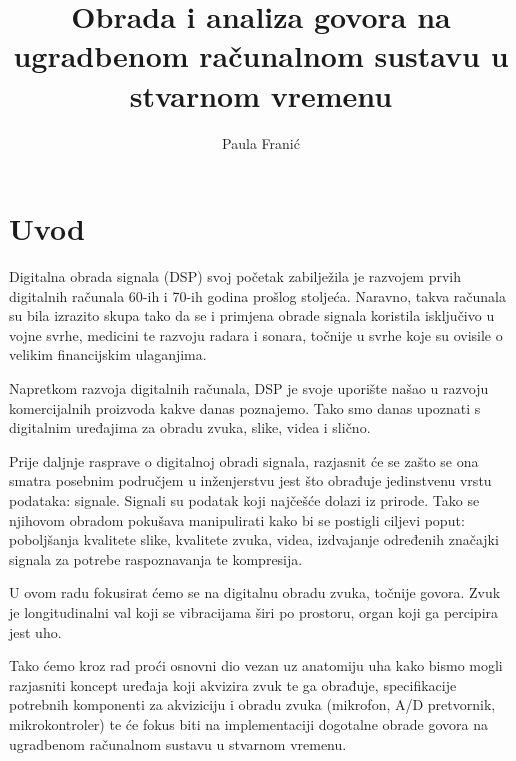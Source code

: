 \documentclass[times, utf8, diplomski]{fer}
\begin{document}

\title{Obrada i analiza govora na ugradbenom računalnom sustavu u stvarnom vremenu}

\author{Paula Franić}

\maketitle

\izvornik

\zahvala{}

\tableofcontents
\listoffigures
\chapter{Uvod}
Digitalna obrada signala (DSP) svoj početak zabilježila je razvojem prvih digitalnih računala 60-ih i 70-ih godina prošlog stoljeća. Naravno, takva računala su bila izrazito skupa tako da se i primjena obrade signala koristila isključivo u vojne svrhe, medicini te razvoju radara i sonara, točnije u svrhe koje su ovisile o velikim financijskim ulaganjima.

Napretkom razvoja digitalnih računala, DSP je svoje uporište našao u razvoju komercijalnih proizvoda kakve danas poznajemo. Tako smo danas upoznati s digitalnim uređajima za obradu zvuka, slike, videa i slično.

Prije daljnje rasprave o digitalnoj obradi signala, razjasnit će se zašto se ona smatra posebnim područjem u inženjerstvu jest što obrađuje jedinstvenu vrstu podataka: signale. Signali su podatak koji najčešće dolazi iz prirode. Tako se njihovom obradom pokušava manipulirati kako bi se postigli ciljevi poput: poboljšanja kvalitete slike, kvalitete zvuka, videa, izdvajanje određenih značajki signala za potrebe raspoznavanja te kompresija.

U ovom radu fokusirat ćemo se na digitalnu obradu zvuka, točnije govora. Zvuk je longitudinalni val koji se vibracijama širi po prostoru, organ koji ga percipira jest uho. 

Tako ćemo kroz rad proći osnovni dio vezan uz anatomiju uha kako bismo mogli razjasniti koncept uređaja koji akvizira zvuk te ga obrađuje, specifikacije potrebnih komponenti za akviziciju i obradu zvuka (mikrofon, A/D pretvornik, mikrokontroler) te će fokus biti na implementaciji dogotalne obrade govora na ugradbenom računalnom sustavu u stvarnom vremenu.
\end{document}
